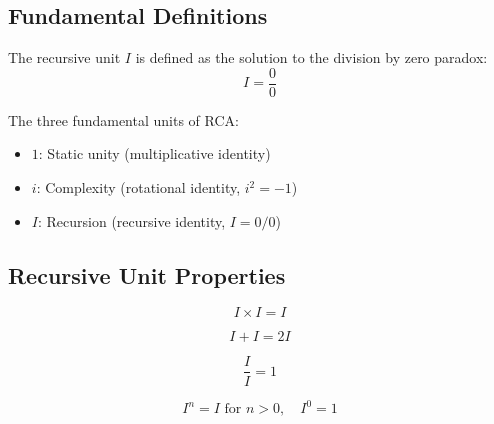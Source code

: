 \documentclass[12pt,a4paper]{article}
\begin{document}
\subsection{Fundamental Definitions}

\begin{definition}
The recursive unit $I$ is defined as the solution to the division by zero paradox:
\begin{equation}
I = \frac{0}{0}
\end{equation}
\end{definition}

\begin{definition}
The three fundamental units of RCA:
\begin{itemize}
\item $1$: Static unity (multiplicative identity)
\item $i$: Complexity (rotational identity, $i^2 = -1$)
\item $I$: Recursion (recursive identity, $I = 0/0$)
\end{itemize}
\end{definition}

\subsection{Recursive Unit Properties}

\begin{axiom}
\begin{equation}
I \times I = I
\end{equation}
\end{axiom}

\begin{axiom}
\begin{equation}
I + I = 2I
\end{equation}
\end{axiom}

\begin{axiom}
\begin{equation}
\frac{I}{I} = 1
\end{equation}
\end{axiom}

\begin{axiom}
\begin{equation}
I^n = I \text{ for } n > 0, \quad I^0 = 1
\end{equation}
\end{axiom}
\end{document}
